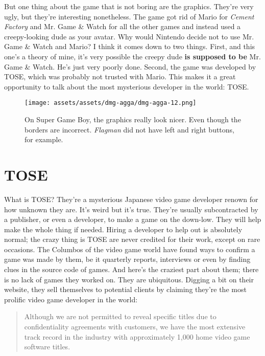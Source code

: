 \documentclass{book}
\begin{document}
But one thing about the game that is not boring are the graphics. They’re very ugly, but they’re interesting nonetheless. The game got rid of Mario for \emph{Cement Factory} and Mr. Game \& Watch for all the other games and instead used a creepy-looking dude as your avatar. Why would Nintendo decide not to use Mr. Game \& Watch and Mario? I think it comes down to two things. First, and this one’s a theory of mine, it’s very possible the creepy dude \textbf{is supposed to be} Mr. Game \& Watch. He’s just very poorly done. Second, the game was developed by TOSE, which was probably not trusted with Mario. This makes it a great opportunity to talk about the most mysterious developer in the world: TOSE.

\begin{figure}[hbt]
\vskip 10pt
\centering \texttt{[image: assets/assets/dmg-agga/dmg-agga-12.png]}\par\pagetwodescription On Super Game Boy, the graphics really look nicer. Even though the borders are incorrect. \emph{Flagman} did not have left and right buttons, for example.
\vskip 6pt
\end{figure}

\FloatBarrier\needspace{5pt}\section*{TOSE}\nopagebreak[4]

What is TOSE? They’re a mysterious Japanese video game developer renown for how unknown they are. It’s weird but it’s true. They’re usually subcontracted by a publisher, or even a developer, to make a game on the down-low. They will help make the whole thing if needed. Hiring a developer to help out is absolutely normal; the crazy thing is TOSE are never credited for their work, except on rare occasions. The Columbos of the video game world have found ways to confirm a game was made by them, be it quarterly reports, interviews or even by finding clues in the source code of games. And here’s the craziest part about them; there is no lack of games they worked on. They are ubiquitous. Digging a bit on their website, they sell themselves to potential clients by claiming they’re the most prolific video game developer in the world:

\begin{quote}
Although we are not permitted to reveal specific titles due to confidentiality agreements with customers, we have the most extensive track record in the industry with approximately 1,000 home video game software titles.
\end{quote} \par
\end{document}
